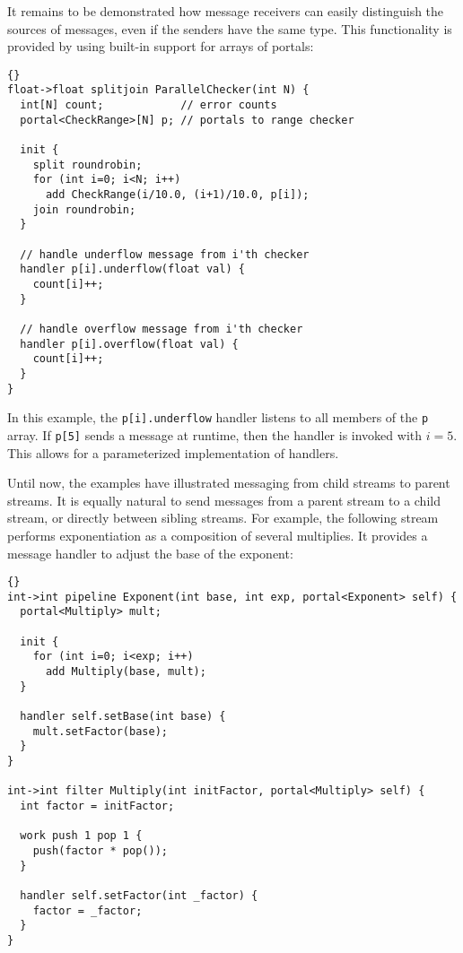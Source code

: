 It remains to be demonstrated how message receivers can easily
distinguish the sources of messages, even if the senders have the same
type.  This functionality is provided by using built-in support for
arrays of portals:


\begin{lstlisting}{}
float->float splitjoin ParallelChecker(int N) {
  int[N] count;            // error counts
  portal<CheckRange>[N] p; // portals to range checker

  init {
    split roundrobin;
    for (int i=0; i<N; i++)
      add CheckRange(i/10.0, (i+1)/10.0, p[i]);
    join roundrobin;
  }

  // handle underflow message from i'th checker
  handler p[i].underflow(float val) {
    count[i]++;
  }

  // handle overflow message from i'th checker
  handler p[i].overflow(float val) {
    count[i]++;
  }
}
\end{lstlisting}{}

In this example, the \lstinline|p[i].underflow| handler listens to all
members of the \lstinline|p| array.  If \lstinline|p[5]| sends a
message at runtime, then the handler is invoked with $i=5$.  This
allows for a parameterized implementation of handlers.

Until now, the examples have illustrated messaging from child streams
to parent streams.  It is equally natural to send messages from a
parent stream to a child stream, or directly between sibling streams.
For example, the following stream performs exponentiation as a
composition of several multiplies.  It provides a message handler to
adjust the base of the exponent:

\begin{lstlisting}{}
int->int pipeline Exponent(int base, int exp, portal<Exponent> self) {
  portal<Multiply> mult;

  init {
    for (int i=0; i<exp; i++)
      add Multiply(base, mult);
  }

  handler self.setBase(int base) {
    mult.setFactor(base);
  }
}

int->int filter Multiply(int initFactor, portal<Multiply> self) {
  int factor = initFactor;

  work push 1 pop 1 {
    push(factor * pop());
  }

  handler self.setFactor(int _factor) {
    factor = _factor;
  }
}
\end{lstlisting}{}

